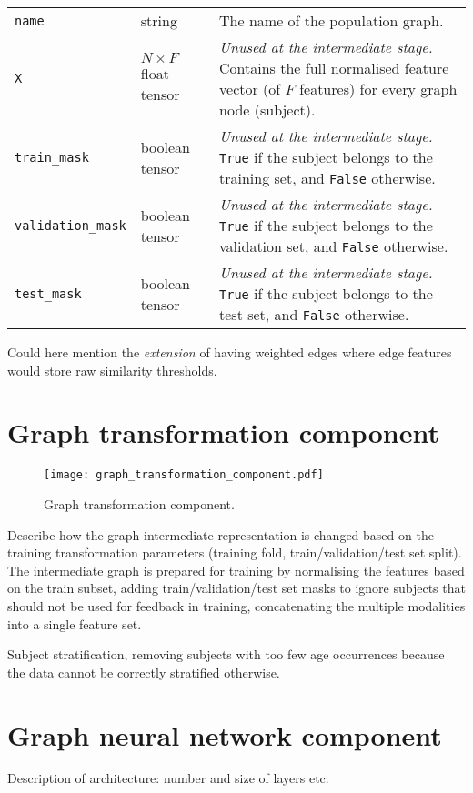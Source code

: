 \begin{table}[]
\begin{tabular}{lp{2.75cm}p{8cm}}
    \texttt{name} & string & The name of the population graph. \\
    \texttt{X} & $N \times F$ \hfill\newline float tensor & \textit{Unused at the intermediate stage.} Contains the full normalised feature vector (of $F$ features) for every graph node (subject). \\
    \texttt{train\_mask} & boolean tensor & \textit{Unused at the intermediate stage.} \texttt{True} if the subject belongs to the training set, and \texttt{False} otherwise. \\
    \texttt{validation\_mask} & boolean tensor & \textit{Unused at the intermediate stage.} \texttt{True} if the subject belongs to the validation set, and \texttt{False} otherwise. \\
    \texttt{test\_mask} & boolean tensor & \textit{Unused at the intermediate stage.} \texttt{True} if the subject belongs to the test set, and \texttt{False} otherwise.
    \end{tabular}
\end{table}


Could here mention the \textit{extension} of having weighted edges where edge features would store raw similarity thresholds.


\section{Graph transformation component}

\begin{figure}[h]
    \centering
    \texttt{[image: graph\_transformation\_component.pdf]}
    \caption{Graph transformation component.}\label{graph-transformation-component}
\end{figure}

Describe how the graph intermediate representation is changed based on the training transformation parameters (training fold, train/validation/test set split). The intermediate graph is prepared for training by normalising the features based on the train subset, adding train/validation/test set masks to ignore subjects that should not be used for feedback in training, concatenating the multiple modalities into a single feature set.

Subject stratification, removing subjects with too few age occurrences because the data cannot be correctly stratified otherwise.


\section{Graph neural network component}
Description of architecture: number and size of layers etc.

